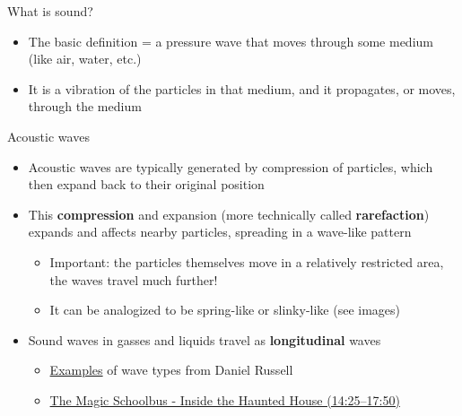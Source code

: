 \documentclass[professionalfonts]{beamer}
\begin{document}
\begin{frame}{What is sound?}
    \begin{itemize}
        \item The basic definition = a pressure wave that moves through some medium (like air, water, etc.)
        \item It is a vibration of the particles in that medium, and it propagates, or moves, through the medium 
    \end{itemize}
\end{frame}

\begin{frame}{Acoustic waves}
    \begin{itemize}
        \item Acoustic waves are typically generated by compression of particles, which then expand back to their original position
        \item This \textbf{compression} and expansion (more technically called \textbf{rarefaction}) expands and affects nearby particles, spreading in a wave-like pattern
        \begin{itemize}
            \item Important: the particles themselves move in a relatively restricted area, the waves travel much further!
            \item It can be analogized to be spring-like or slinky-like (see images)
        \end{itemize}
        \item Sound waves in gasses and liquids travel as \textbf{longitudinal} waves
        \begin{itemize}
            \item \href{https://www.acs.psu.edu/drussell/demos/waves/wavemotion.html}{Examples} of wave types from Daniel Russell
            \item \href{https://youtu.be/_WsAQo8uMhY?si=RpFxY4ZQzH9kzfql&t=865}{The Magic Schoolbus - Inside the Haunted House (14:25–17:50)}
        \end{itemize}
    \end{itemize}
\end{frame}
\end{document}
